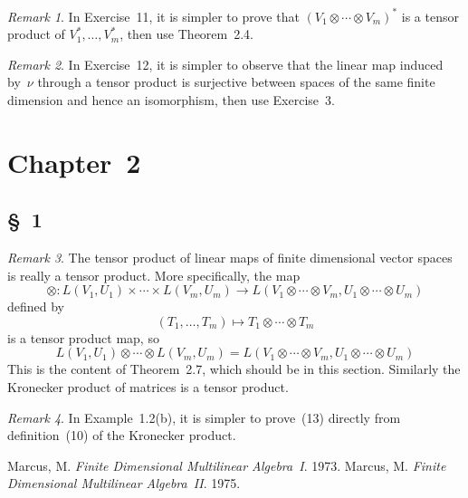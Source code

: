 \documentclass[letterpaper,12pt]{article}
\newcommand{\tprod}{\otimes}
\newcommand{\dual}[1]{#1^*}
\newcommand{\multi}[4]{#2_{#3}#1\cdots#1#2_{#4}}
\newcommand{\tprods}[3]{\multi{\tprod}{#1}{#2}{#3}}
\theoremstyle{definition}
\theoremstyle{remark}
\newtheorem*{rmk}{Remark}
\begin{document}
\begin{rmk}
In Exercise~11, it is simpler to prove that \(\dual{(\tprods{V}{1}{m})}\) is a tensor product of \(\dual{V_1},\ldots,\dual{V_m}\), then use Theorem~2.4.
\end{rmk}

\begin{rmk}
In Exercise~12, it is simpler to observe that the linear map induced by~\(\nu\) through a tensor product is surjective between spaces of the same finite dimension and hence an isomorphism, then use Exercise~3.
\end{rmk}

\section*{Chapter~2}
\subsection*{\S~1}
\begin{rmk}
The tensor product of linear maps of finite dimensional vector spaces is really a tensor product. More specifically, the map
\[\tprod:L(V_1,U_1)\times\cdots\times L(V_m,U_m)\to L(\tprods{V}{1}{m},\tprods{U}{1}{m})\]
defined by
\[(T_1,\ldots,T_m)\mapsto\tprods{T}{1}{m}\]
is a tensor product map, so
\[L(V_1,U_1)\tprod\cdots\tprod L(V_m,U_m)=L(\tprods{V}{1}{m},\tprods{U}{1}{m})\]
This is the content of Theorem~2.7, which should be in this section. Similarly the Kronecker product of matrices is a tensor product.
\end{rmk}

\begin{rmk}
In Example~1.2(b), it is simpler to prove~(13) directly from definition~(10) of the Kronecker product.
\end{rmk}

\newpage
\begin{thebibliography}{0}
 Marcus, M. \textit{Finite Dimensional Multilinear Algebra~I}. 1973.
 Marcus, M. \textit{Finite Dimensional Multilinear Algebra~II}. 1975.
\end{thebibliography}
\end{document}
